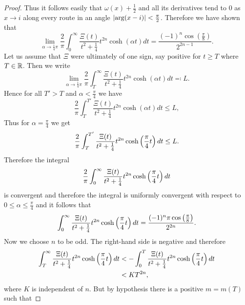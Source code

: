 \begin{proof}
	Thus it follows easily that $\omega(x) + \frac{1}{2}$ and all its derivatives tend to $0$ as $x \to i$ along every route in an angle $\left|\arg(x - i)\right| < \frac{\pi}{2}$. Therefore we have shown that
\begin{equation*}
	\lim _{\alpha \to \frac{1}{4} \pi} \frac{2}{\pi} \int _0 ^{\infty} \frac{\Xi(t)}{t^2 + \frac{1}{4}} t^{2n} \cosh(\alpha t) dt = \frac{(-1)^{n} \cos(\frac{\pi}{8})}{2^{2n - 1}}.
\end{equation*}
	Let us assume that $\Xi$ were ultimately of one sign, say positive for $t \geq T$ where $T \in \mathbb{R}$. Then we write
\begin{equation*}
	\lim _{\alpha \to \frac{1}{4} \pi} \frac{2}{\pi} \int _T ^{\infty} \frac{\Xi(t)}{t^2 + \frac{1}{4}} t^{2n} \cosh(\alpha t) dt \eqqcolon L.
\end{equation*}
	Hence for all $T' > T$ and $\alpha < \frac{\pi}{4}$ we have
\begin{equation*}
	\frac{2}{\pi} \int _T ^{T'} \frac{\Xi(t)}{t^2 + \frac{1}{4}} t^{2n} \cosh(\alpha t) dt \leq L,
\end{equation*}
	Thus for $\alpha = \frac{\pi}{4}$ we get
\begin{equation*}
	\frac{2}{\pi} \int _T ^{T'} \frac{\Xi(t)}{t^2 + \frac{1}{4}} t^{2n} \cosh\left(\frac{\pi}{4} t\right) dt \leq L.
\end{equation*}
	Therefore the integral
\begin{equation*}
	\frac{2}{\pi} \int _0 ^{\infty} \frac{\Xi(t)}{t^2 + \frac{1}{4}} t^{2n} \cosh\left(\frac{\pi}{4} t\right) dt
\end{equation*}
	is convergent and therefore the integral is uniformly convergent with respect to $0 \leq \alpha \leq \frac{\pi}{4}$ and it follows that
\begin{equation*}
	\int _0 ^{\infty} \frac{\Xi(t)}{t^2 + \frac{1}{4}} t^{2n} \cosh\left(\frac{\pi}{4} t\right) dt = \frac{(-1)^{n} \pi \cos\left(\frac{\pi}{8}\right)}{2^{2n}}.
\end{equation*}
	Now we choose $n$ to be odd. The right-hand side is negative and therefore
\begin{equation*}
\begin{aligned}
	\int _T ^{\infty} \frac{\Xi(t)}{t^2 + \frac{1}{4}} t^{2n} \cosh\left(\frac{\pi}{4} t\right) dt 
		&< - \int _0 ^{T} \frac{\Xi(t)}{t^2 + \frac{1}{4}} t^{2n} \cosh\left(\frac{\pi}{4} t\right) dt \\
		&< KT^{2n},
\end{aligned}
\end{equation*}
	where $K$ is independent of $n$. But by hypothesis there is a positive $m = m(T)$ such that

\end{proof}

